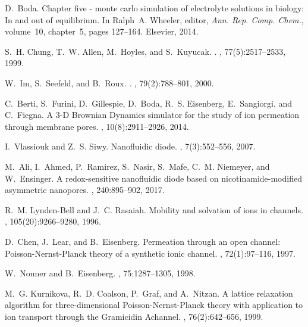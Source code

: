 \documentclass[fleqn,10pt]{SelfArx} %
\begin{document}
\begin{thebibliography}{10}
D.~Boda.
\newblock Chapter five - monte carlo simulation of electrolyte solutions in
  biology: In and out of equilibrium.
\newblock In Ralph~A. Wheeler, editor, {\em Ann. Rep. Comp. Chem.}, volume~10,
  chapter~5, pages 127--164. Elsevier, 2014.

S.~H. Chung, T.~W. Allen, M.~Hoyles, and S.~Kuyucak.
.
, 77(5):2517--2533, 1999.

W.~Im, S.~Seefeld, and B.~Roux.
.
, 79(2):788--801, 2000.

C.~Berti, S.~Furini, D.~Gillespie, D.~Boda, R.~S. Eisenberg, E.~Sangiorgi, and
  C.~Fiegna.
\newblock A {3-D Brownian Dynamics} simulator for the study of ion permeation
  through membrane pores.
, 10(8):2911--2926, 2014.

I.~Vlassiouk and Z.~S. Siwy.
\newblock Nanofluidic diode.
, 7(3):552--556, 2007.

M.~Ali, I.~Ahmed, P.~Ramirez, S.~Nasir, S.~Mafe, C.~M. Niemeyer, and
  W.~Ensinger.
\newblock A redox-sensitive nanofluidic diode based on nicotinamide-modified
  asymmetric nanopores.
, 240:895--902, 2017.

R.~M. Lynden-Bell and J.~C. Rasaiah.
\newblock Mobility and solvation of ions in channels.
, 105(20):9266--9280, 1996.

D.~Chen, J.~Lear, and B.~Eisenberg.
\newblock Permeation through an open channel: {Poisson-Nernst-Planck} theory of
  a synthetic ionic channel.
, 72(1):97--116, 1997.

W.~Nonner and B.~Eisenberg.
, 75:1287--1305, 1998.

M.~G. Kurnikova, R.~D. Coalson, P.~Graf, and A.~Nitzan.
\newblock A lattice relaxation algorithm for three-dimensional
  {Poisson-Nernst-Planck} theory with application to ion transport through the
  {Gramicidin A}channel.
, 76(2):642--656, 1999.


\end{thebibliography}
\end{document}
